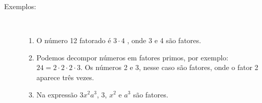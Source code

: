 \begin{center}\end{center}


\begin{description}
\item [Exemplos:] ~
\begin{enumerate}[label=\alph*)]
\item O número 12 fatorado é $3 \cdot 4$ , onde 3 e 4 são fatores.

\item Podemos decompor números em fatores primos, por exemplo: $24 = 2 \cdot2 \cdot 2 \cdot 3$. Os números 2 e 3, nesse caso são fatores, onde o fator 2 aparece três vezes.

\item Na expressão $3x^2a^3$, 3, $x^2$  e $a^3$ são fatores.
\end{enumerate}
\end{description}

